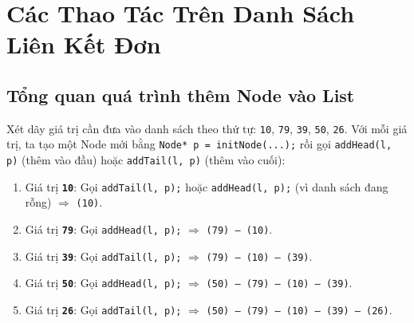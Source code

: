 \documentclass[12pt,a4paper]{article}
\begin{document}
\section{Các Thao Tác Trên Danh Sách Liên Kết Đơn}

\subsection{Tổng quan quá trình thêm Node vào List}
Xét dãy giá trị cần đưa vào danh sách theo thứ tự: \texttt{10}, \texttt{79}, \texttt{39}, \texttt{50}, \texttt{26}. Với mỗi giá trị, ta tạo một Node mới bằng \texttt{Node* p = initNode(...);} rồi gọi \texttt{addHead(l, p)} (thêm vào đầu) hoặc \texttt{addTail(l, p)} (thêm vào cuối):

\begin{enumerate}[itemsep=0.25em]
    \item Giá trị \textbf{\texttt{10}}: Gọi \texttt{addTail(l, p);} hoặc \texttt{addHead(l, p);} (vì danh sách đang rỗng) $\Rightarrow$ \texttt{(10)}.
    \item Giá trị \textbf{\texttt{79}}: Gọi \texttt{addHead(l, p);} $\Rightarrow$ \texttt{(79) -- (10)}.
    \item Giá trị \textbf{\texttt{39}}: Gọi \texttt{addTail(l, p);} $\Rightarrow$ \texttt{(79) -- (10) -- (39)}.
    \item Giá trị \textbf{\texttt{50}}: Gọi \texttt{addHead(l, p);} $\Rightarrow$ \texttt{(50) -- (79) -- (10) -- (39)}.
    \item Giá trị \textbf{\texttt{26}}: Gọi \texttt{addTail(l, p);} $\Rightarrow$ \texttt{(50) -- (79) -- (10) -- (39) -- (26)}.
\end{enumerate}
\end{document}
